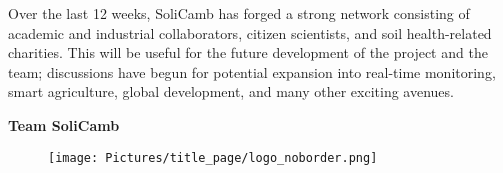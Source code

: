 Over the last 12 weeks, SoliCamb has forged a strong network consisting of academic and industrial collaborators, citizen scientists, and soil health-related charities. This will be useful for the future development of the project and the team; discussions have begun for potential expansion into real-time monitoring, smart agriculture, global development, and many other exciting avenues. \\

\begin{flushright}
\textbf{Team SoliCamb}
\end{flushright}


\begin{figure}[htb]
\centering
\texttt{[image: Pictures/title\_page/logo\_noborder.png]}
\end{figure}

